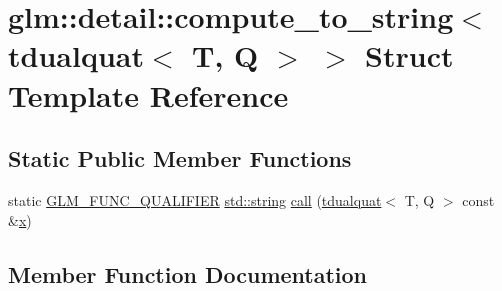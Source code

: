 \hypertarget{structglm_1_1detail_1_1compute__to__string_3_01tdualquat_3_01_t_00_01_q_01_4_01_4}{}\section{glm\+:\+:detail\+:\+:compute\+\_\+to\+\_\+string$<$ tdualquat$<$ T, Q $>$ $>$ Struct Template Reference}
\label{structglm_1_1detail_1_1compute__to__string_3_01tdualquat_3_01_t_00_01_q_01_4_01_4}
\subsection*{Static Public Member Functions}
\begin{DoxyCompactItemize}
\item 
static \mbox{\hyperlink{setup_8hpp_a33fdea6f91c5f834105f7415e2a64407}{G\+L\+M\+\_\+\+F\+U\+N\+C\+\_\+\+Q\+U\+A\+L\+I\+F\+I\+ER}} \mbox{\hyperlink{_s_d_l__opengl__glext_8h_ae84541b4f3d8e1ea24ec0f466a8c568b}{std\+::string}} \mbox{\hyperlink{structglm_1_1detail_1_1compute__to__string_3_01tdualquat_3_01_t_00_01_q_01_4_01_4_a312a529ab87f8e85ad185676dd31267d}{call}} (\mbox{\hyperlink{structglm_1_1tdualquat}{tdualquat}}$<$ T, Q $>$ const \&\mbox{\hyperlink{_s_d_l__opengl_8h_ad0e63d0edcdbd3d79554076bf309fd47}{x}})
\end{DoxyCompactItemize}


\subsection{Member Function Documentation}
\mbox{\label{structglm_1_1detail_1_1compute__to__string_3_01tdualquat_3_01_t_00_01_q_01_4_01_4_a312a529ab87f8e85ad185676dd31267d}} 
